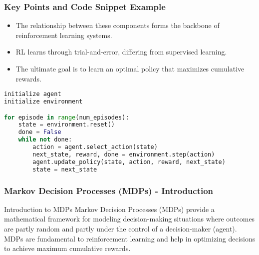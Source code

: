 \documentclass[aspectratio=169]{beamer}
\begin{document}
\begin{frame}[fragile]
    \frametitle{Key Points and Code Snippet Example}
    \begin{itemize}
        \item The relationship between these components forms the backbone of reinforcement learning systems.
        \item RL learns through trial-and-error, differing from supervised learning.
        \item The ultimate goal is to learn an optimal policy that maximizes cumulative rewards.
    \end{itemize}

    \begin{lstlisting}[language=python]
initialize agent
initialize environment

for episode in range(num_episodes):
    state = environment.reset()
    done = False
    while not done:
        action = agent.select_action(state)
        next_state, reward, done = environment.step(action)
        agent.update_policy(state, action, reward, next_state)
        state = next_state
    \end{lstlisting}
\end{frame}

\begin{frame}[fragile]
    \frametitle{Markov Decision Processes (MDPs) - Introduction}
    \begin{block}{Introduction to MDPs}
        Markov Decision Processes (MDPs) provide a mathematical framework for modeling decision-making situations where outcomes are partly random and partly under the control of a decision-maker (agent).
        MDPs are fundamental to reinforcement learning and help in optimizing decisions to achieve maximum cumulative rewards.
    \end{block}
\end{frame}
\end{document}
